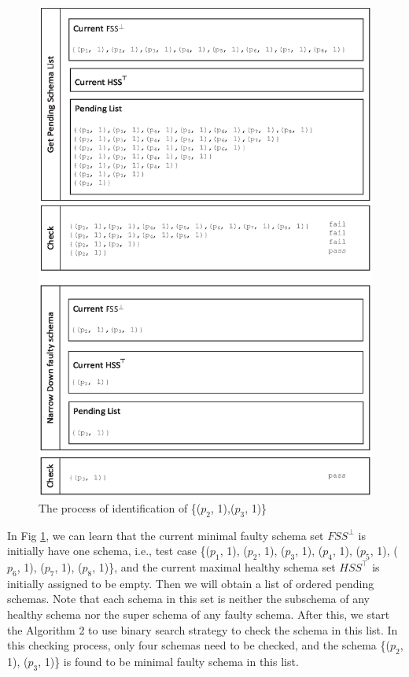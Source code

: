 \documentclass{sig-alternate-05-2015}
\begin{document}
{\begin{figure}
 \centering
 \includegraphics[width=5.8in]{exofalo.eps}
 \caption{The process of identification of \{($p_{2}$, 1),($p_{3}$, 1)\}}
 \label{fig_exofalo}
\end{figure}

In Fig \ref{fig_exofalo}, we can learn that the current minimal faulty schema set $FSS^{\bot}$ is initially have one schema, i.e., test case \{($p_{1}$, 1), ($p_{2}$, 1), ($p_{3}$, 1), ($p_{4}$, 1), ($p_{5}$, 1), ($p_{6}$, 1), ($p_{7}$, 1), ($p_{8}$, 1)\}, and the current maximal healthy schema set $HSS^{\top}$ is initially assigned to be empty. Then we will obtain a list of ordered pending schemas.  Note that each schema in this set is neither the subschema of any healthy schema nor the super schema of any faulty schema. After this, we start the Algorithm 2 to use binary search strategy to check the schema in this list. In this checking process, only four schemas need to be checked, and the schema \{($p_{2}$, 1), ($p_{3}$, 1)\} is found to be minimal faulty schema in this list.

}
\end{document}
